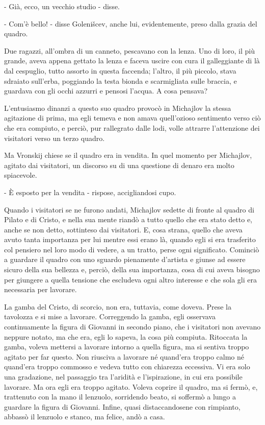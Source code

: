 - Già, ecco, un vecchio studio - disse. 

- Com'è bello! - disse Golenišcev, anche lui, evidentemente, preso dalla grazia del quadro. 

Due ragazzi, all'ombra di un canneto, pescavano con la lenza. Uno di loro, il più grande, aveva appena gettato la lenza e faceva uscire con cura il galleggiante di là dal cespuglio, tutto assorto in questa faccenda; l'altro, il più piccolo, stava sdraiato sull'erba, poggiando la testa bionda e scarmigliata sulle braccia, e guardava con gli occhi azzurri e pensosi l'acqua. A cosa pensava? 

L'entusiasmo dinanzi a questo suo quadro provocò in Michajlov la stessa agitazione di prima, ma egli temeva e non amava quell'ozioso sentimento verso ciò che era compiuto, e perciò, pur rallegrato dalle lodi, volle attrarre l'attenzione dei visitatori verso un terzo quadro. 

Ma Vronskij chiese se il quadro era in vendita. In quel momento per Michajlov, agitato dai visitatori, un discorso su di una questione di denaro era molto spiacevole. 

- È esposto per la vendita - rispose, accigliandosi cupo. 

Quando i visitatori se ne furono andati, Michajlov sedette di fronte al quadro di Pilato e di Cristo, e nella sua mente riandò a tutto quello che era stato detto e, anche se non detto, sottinteso dai visitatori. E, cosa strana, quello che aveva avuto tanta importanza per lui mentre essi erano là, quando egli si era trasferito col pensiero nel loro modo di vedere, a un tratto, perse ogni significato. Cominciò a guardare il quadro con uno sguardo pienamente d'artista e giunse ad essere sicuro della sua bellezza e, perciò, della sua importanza, cosa di cui aveva bisogno per giungere a quella tensione che escludeva ogni altro interesse e che sola gli era necessaria per lavorare. 

La gamba del Cristo, di scorcio, non era, tuttavia, come doveva. Prese la tavolozza e si mise a lavorare. Correggendo la gamba, egli osservava continuamente la figura di Giovanni in secondo piano, che i visitatori non avevano neppure notato, ma che era, egli lo sapeva, la cosa più compiuta. Ritoccata la gamba, voleva mettersi a lavorare intorno a quella figura, ma si sentiva troppo agitato per far questo. Non riusciva a lavorare né quand'era troppo calmo né quand'era troppo commosso e vedeva tutto con chiarezza eccessiva. Vi era solo una gradazione, nel passaggio tra l'aridità e l'ispirazione, in cui era possibile lavorare. Ma ora egli era troppo agitato. Voleva coprire il quadro, ma si fermò, e, trattenuto con la mano il lenzuolo, sorridendo beato, si soffermò a lungo a guardare la figura di Giovanni. Infine, quasi distaccandosene con rimpianto, abbassò il lenzuolo e stanco, ma felice, andò a casa. 

